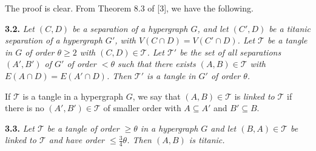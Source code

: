 The proof is clear. From Theorem 8.3 of [3], we have the following.

\textbf{3.2.} \textit{Let $(C, D)$ be a separation of a hypergraph $G$, and let $(C', D)$ be a titanic separation of a hypergraph $G'$, with $V(C \cap D) = V(C' \cap D)$. Let $\mathscr{T}$ be a tangle in $G$ of order $\theta \ge 2$ with $(C, D) \in \mathscr{T}$. Let $\mathscr{T}'$ be the set of all separations $(A', B')$ of $G'$ of order $< \theta$ such that there exists $(A, B) \in \mathscr{T}$ with $E(A \cap D) = E(A' \cap D)$. Then $\mathscr{T}'$ is a tangle in $G'$ of order $\theta$.}

If $\mathscr{T}$ is a tangle in a hypergraph $G$, we say that $(A, B) \in \mathscr{T}$ is \textit{linked to} $\mathscr{T}$ if there is no $(A', B') \in \mathscr{T}$ of smaller order with $A \subseteq A'$ and $B' \subseteq B$.

\textbf{3.3.} \textit{Let $\mathscr{T}$ be a tangle of order $\ge \theta$ in a hypergraph $G$ and let $(B, A) \in \mathscr{T}$ be linked to $\mathscr{T}$ and have order $\le \frac{3}{4}\theta$. Then $(A, B)$ is titanic.}
